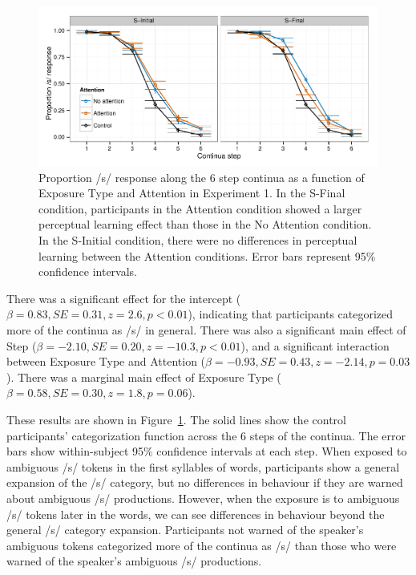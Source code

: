 \documentclass[11pt]{article}\usepackage[]{graphicx}\usepackage[]{color}
\begin{document}
\begin{figure}[!ht]
\caption{Proportion /s/ response along the 6 step continua as a function of Exposure Type and Attention in Experiment 1.    In the S-Final condition, participants in the Attention condition showed a larger perceptual learning effect than those in the No Attention condition.  In the S-Initial condition, there were no differences in perceptual learning between the Attention conditions. Error bars represent 95\% confidence intervals.}
\label{fig:exp1categ}
\begin{center}
\includegraphics[width=\textwidth]{graphs/exp1_categresults}
\end{center}
\end{figure}

There was a significant effect for the intercept ($\beta = 0.83, SE = 0.31, z = 2.6, p < 0.01$), indicating that participants categorized more of the continua as /s/ in general.  There was also a significant main effect of Step ($\beta = -2.10, SE = 0.20, z = -10.3, p < 0.01$), and a significant interaction between Exposure Type and Attention ($\beta = -0.93, SE = 0.43, z = -2.14, p = 0.03$).  There was a marginal main effect of Exposure Type ($\beta =0.58, SE = 0.30, z = 1.8, p = 0.06$).  

These results are shown in Figure~\ref{fig:exp1categ}.  
The solid lines show the control participants' categorization function across the 6 steps of the continua.  
The error bars show within-subject 95\% confidence intervals at each step.  
When exposed to ambiguous /s/ tokens in the first syllables of words, participants show a general expansion of the /s/ category, but no differences in behaviour if they are warned about ambiguous /s/ productions.  
However, when the exposure is to ambiguous /s/ tokens later in the words, we can see differences in behaviour beyond the general /s/ category expansion.  
Participants not warned of the speaker's ambiguous tokens categorized more of the continua as /s/ than those who were warned of the speaker's ambiguous /s/ productions.
\end{document}
